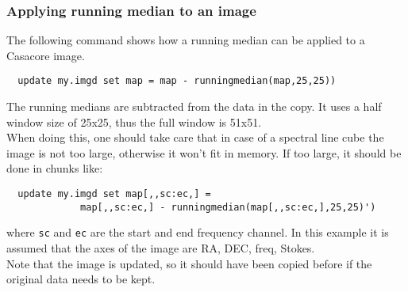 \subsubsection{\label{TAQL:RUNEXAMPLES}Applying running median to an image}
The following command shows how a running median can 
be applied to a Casacore image.
\begin{verbatim}
  update my.imgd set map = map - runningmedian(map,25,25))
\end{verbatim}
The running medians are
subtracted from the data in the copy. It uses a half window size 
of 25x25, thus the full window is 51x51.
\\When doing this, one should take care that in case of a spectral
line cube the image is not too large, otherwise it won't fit in
memory. If too large, it should be done in chunks like:
\begin{verbatim}
  update my.imgd set map[,,sc:ec,] =
             map[,,sc:ec,] - runningmedian(map[,,sc:ec,],25,25)')
\end{verbatim}
where \texttt{sc} and \texttt{ec} are the start and end frequency
channel.
In this example it is assumed that the axes of the image are RA, DEC,
freq, Stokes.
\\Note that the image is updated, so it should have been copied before
if the original data needs to be kept.

